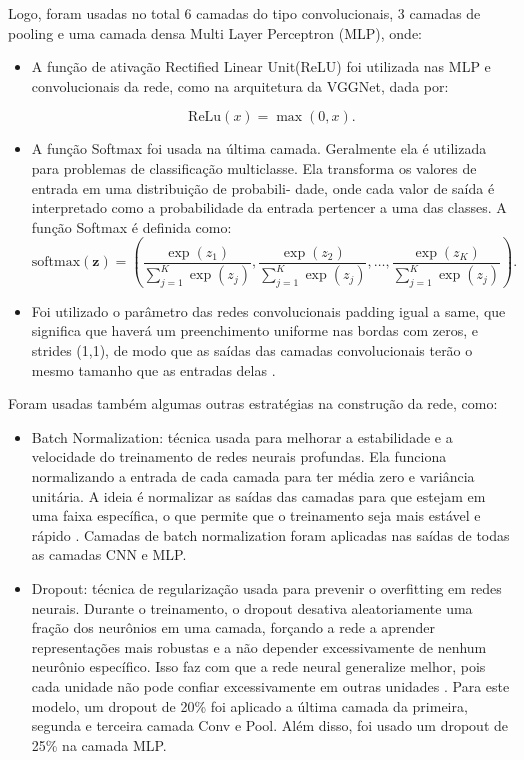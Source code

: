 \documentclass[]{abntex2}
\begin{document}
Logo, foram usadas no total 6 camadas do tipo convolucionais, 3 camadas de pooling e uma camada densa Multi Layer Perceptron (MLP), onde:

\begin{itemize}
    \item A função de ativação Rectified Linear Unit(ReLU) foi utilizada nas MLP e convolucionais da rede, como na arquitetura da VGGNet, dada por:
    
    \[
    \text{ReLu}(x) = \max(0, x).
    \]

    \item A função Softmax foi usada na última camada. Geralmente ela é utilizada para problemas de
    classificação multiclasse. Ela transforma os valores de entrada em uma distribuição de probabili-
    dade, onde cada valor de saída é interpretado como a probabilidade da entrada pertencer a uma
    das classes. A função Softmax é definida como:
    \[
        \text{softmax}(\mathbf{z}) = \left( \frac{\exp(z_1)}{\sum_{j=1}^{K} \exp(z_j)}, \frac{\exp(z_2)}{\sum_{j=1}^{K} \exp(z_j)}, \ldots, \frac{\exp(z_K)}{\sum_{j=1}^{K} \exp(z_j)} \right).
    \]
    
    \item Foi utilizado o parâmetro das redes convolucionais padding igual a same, que significa que haverá um preenchimento uniforme nas bordas com zeros, e strides (1,1), de modo que as saídas das camadas convolucionais terão o mesmo tamanho que as entradas delas \cite{keras}.
\end{itemize}

Foram usadas também algumas outras estratégias na construção da rede, como:

\begin{itemize}
    \item Batch Normalization: técnica usada para melhorar a estabilidade e a velocidade do treinamento de redes neurais profundas. Ela funciona normalizando a entrada de cada camada para ter média zero e variância unitária. A ideia é normalizar as saídas das camadas para que estejam em uma faixa específica, o que permite que o treinamento seja mais estável e rápido \cite{ioffe2015batch}. Camadas de batch normalization foram aplicadas nas saídas de todas as camadas CNN e MLP.
    \item Dropout: técnica de regularização usada para prevenir o overfitting em redes neurais. Durante o treinamento, o dropout desativa aleatoriamente uma fração dos neurônios em uma camada, forçando a rede a aprender representações mais robustas e a não depender excessivamente de nenhum neurônio específico. Isso faz com que a rede neural generalize melhor, pois cada unidade não pode confiar excessivamente em outras unidades \cite{srivastava2014dropout}. Para este modelo, um dropout de 20\% foi aplicado a última camada da primeira, segunda e terceira camada Conv e Pool. Além disso, foi usado um dropout de 25\% na camada MLP.
\end{itemize}
\end{document}
